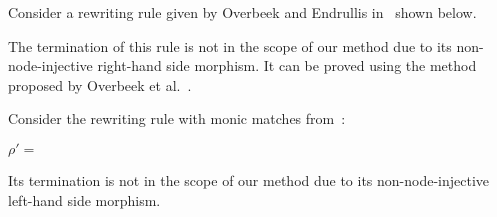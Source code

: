 \begin{example}[Limitation]
    \label{ex:overbeek:5d2:limitation}
    Consider a rewriting rule given by Overbeek and Endrullis in~\cite[Example 5.2]{overbeek2024termination_lmcs} shown below.
  \begin{center} 
  \end{center}
    The termination of this rule is not in the scope of our method due to its non-node-injective right-hand side morphism. It can be proved using the method proposed by Overbeek et al.~\cite{overbeek2024termination_lmcs}.
\end{example}
 
\begin{example}[Limitation]
  \label{ex:overbeek:5d6_bis:limitation} 
  Consider the rewriting rule with monic matches from~\cite[Example 5.6]{overbeek2024termination_lmcs}:
  \begin{center}
    $\rho'\mathop{=}$\scalebox{0.9} { }
  \end{center} 
  Its termination is not in the scope of our method due to its non-node-injective left-hand side morphism. 
\end{example}